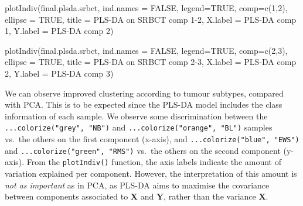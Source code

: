 \documentclass[
]{book}
\newenvironment{Shaded}{\begin{snugshade}}{\end{snugshade}}
\newcommand{\AttributeTok}[1]{\textcolor[rgb]{0.77,0.63,0.00}{#1}}
\newcommand{\ConstantTok}[1]{\textcolor[rgb]{0.00,0.00,0.00}{#1}}
\newcommand{\DecValTok}[1]{\textcolor[rgb]{0.00,0.00,0.81}{#1}}
\newcommand{\FunctionTok}[1]{\textcolor[rgb]{0.00,0.00,0.00}{#1}}
\newcommand{\NormalTok}[1]{#1}
\newcommand{\StringTok}[1]{\textcolor[rgb]{0.31,0.60,0.02}{#1}}
\begin{document}
\begin{Shaded}
\begin{Highlighting}[]
\FunctionTok{plotIndiv}\NormalTok{(final.plsda.srbct, }\AttributeTok{ind.names =} \ConstantTok{FALSE}\NormalTok{, }\AttributeTok{legend=}\ConstantTok{TRUE}\NormalTok{,}
          \AttributeTok{comp=}\FunctionTok{c}\NormalTok{(}\DecValTok{1}\NormalTok{,}\DecValTok{2}\NormalTok{), }\AttributeTok{ellipse =} \ConstantTok{TRUE}\NormalTok{, }
          \AttributeTok{title =} \StringTok{\textquotesingle{}PLS{-}DA on SRBCT comp 1{-}2\textquotesingle{}}\NormalTok{,}
          \AttributeTok{X.label =} \StringTok{\textquotesingle{}PLS{-}DA comp 1\textquotesingle{}}\NormalTok{, }\AttributeTok{Y.label =} \StringTok{\textquotesingle{}PLS{-}DA comp 2\textquotesingle{}}\NormalTok{)}
\end{Highlighting}
\end{Shaded}

\begin{Shaded}
\begin{Highlighting}[]
\FunctionTok{plotIndiv}\NormalTok{(final.plsda.srbct, }\AttributeTok{ind.names =} \ConstantTok{FALSE}\NormalTok{, }\AttributeTok{legend=}\ConstantTok{TRUE}\NormalTok{,}
          \AttributeTok{comp=}\FunctionTok{c}\NormalTok{(}\DecValTok{2}\NormalTok{,}\DecValTok{3}\NormalTok{), }\AttributeTok{ellipse =} \ConstantTok{TRUE}\NormalTok{, }
          \AttributeTok{title =} \StringTok{\textquotesingle{}PLS{-}DA on SRBCT comp 2{-}3\textquotesingle{}}\NormalTok{,}
          \AttributeTok{X.label =} \StringTok{\textquotesingle{}PLS{-}DA comp 2\textquotesingle{}}\NormalTok{, }\AttributeTok{Y.label =} \StringTok{\textquotesingle{}PLS{-}DA comp 3\textquotesingle{}}\NormalTok{)}
\end{Highlighting}
\end{Shaded}



We can observe improved clustering according to tumour subtypes, compared with PCA. This is to be expected since the PLS-DA model includes the class information of each sample. We observe some discrimination between the \texttt{...colorize("grey",\ "NB")} and \texttt{...colorize("orange",\ "BL")} samples vs.~the others on the first component (x-axis), and \texttt{...colorize("blue",\ "EWS")} and \texttt{...colorize("green",\ "RMS")} vs.~the others on the second component (y-axis). From the \texttt{plotIndiv()} function, the axis labels indicate the amount of variation explained per component. However, the interpretation of this amount is \emph{not as important} as in PCA, as PLS-DA aims to maximise the covariance between components associated to \(\boldsymbol X\) and \(\boldsymbol Y\), rather than the variance \(\boldsymbol X\).
\end{document}
